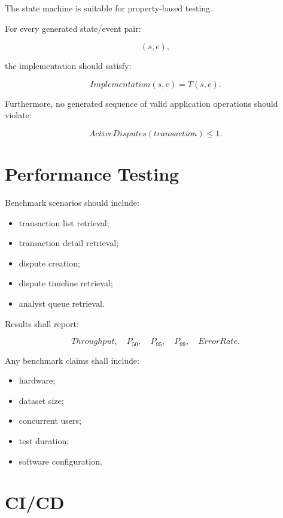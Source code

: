 \documentclass[11pt,a4paper]{article}
\begin{document}
The state machine is suitable for property-based testing.

For every generated state/event pair:

\[
(s,e),
\]

the implementation should satisfy:

\[
Implementation(s,e)
=
T(s,e).
\]

Furthermore, no generated sequence of valid application operations
should violate:

\[
ActiveDisputes(transaction)\leq1.
\]

\section{Performance Testing}

Benchmark scenarios should include:

\begin{itemize}
    \item transaction list retrieval;
    \item transaction detail retrieval;
    \item dispute creation;
    \item dispute timeline retrieval;
    \item analyst queue retrieval.
\end{itemize}

Results shall report:

\[
Throughput,
\quad
P_{50},
\quad
P_{95},
\quad
P_{99},
\quad
ErrorRate.
\]

Any benchmark claims shall include:

\begin{itemize}
    \item hardware;
    \item dataset size;
    \item concurrent users;
    \item test duration;
    \item software configuration.
\end{itemize}

\section{CI/CD}
\end{document}
